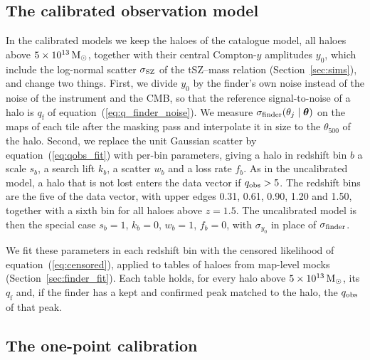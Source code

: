 \subsection{The calibrated observation model}\label{sec:calib-model}

In the calibrated models we keep the haloes of the catalogue model, all haloes above
$5\times10^{13}\,\mathrm{M}_\odot$, together with their central Compton-$y$ amplitudes $y_0$, which include the
log-normal scatter $\sigma_\mathrm{SZ}$ of the tSZ--mass relation (Section~\ref{sec:sims}), and change two things. First,
we divide $y_0$ by the finder's own noise instead of the noise of the instrument and the CMB, so that the
reference signal-to-noise of a halo is $q_\mathrm{f}$ of equation~(\ref{eq:q_finder_noise}). We measure
$\sigma_\mathrm{finder}(\theta_j\mid\bm\theta)$ on the maps of each tile after the masking pass and interpolate it in
size to the $\theta_{500}$ of the halo. Second, we replace the unit Gaussian scatter by
equation~(\ref{eq:qobs_fit}) with per-bin parameters, giving a halo in redshift bin $b$ a scale $s_b$, a search
lift $k_b$, a scatter $w_b$ and a loss rate $f_b$. As in the uncalibrated model, a halo that is not lost enters
the data vector if $q_\mathrm{obs} > 5$. The redshift bins are the five of the data vector, with upper edges 0.31,
0.61, 0.90, 1.20 and 1.50, together with a sixth bin for all haloes above $z = 1.5$. The uncalibrated model is
then the special case $s_b=1$, $k_b=0$, $w_b=1$, $f_b=0$, with $\sigma_{y_0}$ in place of $\sigma_\mathrm{finder}$.

We fit these parameters in each redshift bin with the censored likelihood of equation~(\ref{eq:censored}),
applied to tables of haloes from map-level mocks (Section~\ref{sec:finder_fit}). Each table holds, for every
halo above $5\times10^{13}\,\mathrm{M}_\odot$, its $q_\mathrm{f}$ and, if the finder has a kept and confirmed peak matched
to the halo, the $q_\mathrm{obs}$ of that peak.

\subsection{The one-point calibration}\label{sec:calib-point}

